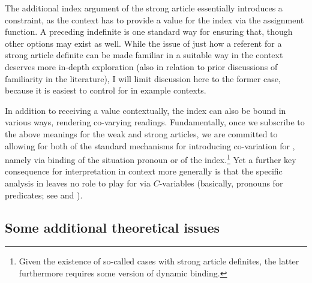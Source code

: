 \documentclass[output=paper
,modfonts
,nonflat]{langscibook}
\begin{document}
The additional index argument of the strong article essentially
introduces a  constraint, as the context has to provide a
value for the index via the assignment function. A preceding
indefinite is one standard way for ensuring that, though other options
may exist as well. While the issue of just how a referent for a strong
article definite can be made familiar in a suitable way in the context deserves more in-depth exploration (also in relation to prior
discussions of familiarity in the literature), I will limit
discussion here to the former case, because it is easiest to control for in
example contexts. 

In addition to receiving a value contextually, the
index can also be bound in various ways, rendering co-varying
readings. Fundamentally, once we subscribe to the above meanings for
the weak and strong articles, we are committed to allowing for both of
the standard mechanisms for introducing co-variation for ,
namely via binding of the situation pronoun or of the
index.\footnote{Given the existence of so-called  cases
  with strong article definites, the latter furthermore requires some
  version of dynamic binding.} Yet a
further key consequence for interpretation in context more generally
is that
the specific analysis in \citet{Schwarz2009} leaves no role to play
for  via $C$-variables (basically, pronouns for
predicates; see \citealt{Fintel1994} and \citealt{StanleySzabo2000}). 


\subsection{Some additional theoretical issues}
\end{document}
